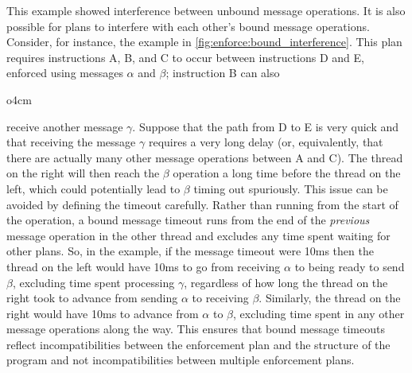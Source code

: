  This example showed interference between
unbound message operations.  It is also possible for plans to
interfere with each other's bound message operations.  Consider, for
instance, the example in \autoref{fig:enforce:bound_interference}.
This plan requires instructions A, B, and C to occur between
instructions D and E, enforced using messages $\alpha$ and $\beta$;
instruction B can also
\begin{wrapfigure}{o}{4cm}
  \vspace{-15pt}
  \vspace{-12pt}
\end{wrapfigure}
receive another message $\gamma$.  Suppose that the path from D to E
is very quick and that receiving the message $\gamma$ requires a very
long delay (or, equivalently, that there are actually many other
message operations between A and C).  The thread on the right will
then reach the $\beta$ operation a long time before the thread on the
left, which could potentially lead to $\beta$ timing out spuriously.
This issue can be avoided by defining the timeout carefully.  Rather
than running from the start of the operation, a bound message timeout
runs from the end of the \emph{previous} message operation in the
other thread and excludes any time spent waiting for other plans.  So,
in the example, if the message timeout were 10ms then the thread on
the left would have 10ms to go from receiving $\alpha$ to being ready
to send $\beta$, excluding time spent processing $\gamma$, regardless
of how long the thread on the right took to advance from sending
$\alpha$ to receiving $\beta$.  Similarly, the thread on the right
would have 10ms to advance from $\alpha$ to $\beta$, excluding time
spent in any other message operations along the way.  This ensures
that bound message timeouts reflect incompatibilities between the
enforcement plan and the structure of the program and not
incompatibilities between multiple enforcement plans.

